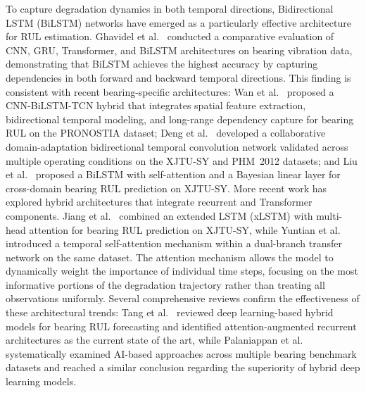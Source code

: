 \documentclass[review]{elsarticle}
\begin{document}
To capture degradation dynamics in both temporal directions,
Bidirectional LSTM (BiLSTM) networks have emerged as a particularly
effective architecture for RUL estimation.
Ghavidel et al.~\cite{ghavidel_remaining_2026} conducted a
comparative evaluation of CNN, GRU, Transformer, and BiLSTM
architectures on bearing vibration data, demonstrating that BiLSTM
achieves the highest accuracy by capturing dependencies in both
forward and backward temporal directions. This finding is consistent
with recent bearing-specific architectures:
Wan et al.~\cite{wan_robust_2026} proposed a CNN-BiLSTM-TCN hybrid
that integrates spatial feature extraction, bidirectional temporal
modeling, and long-range dependency capture for bearing RUL on the
PRONOSTIA dataset;
Deng et al.~\cite{DENG2026112193} developed a collaborative
domain-adaptation bidirectional temporal convolution network validated
across multiple operating conditions on the XJTU-SY and PHM~2012
datasets; and
Liu et al.~\cite{liu_deep_2026} proposed a BiLSTM with self-attention
and a Bayesian linear layer for cross-domain bearing RUL prediction on
XJTU-SY. More recent work has explored
hybrid architectures that integrate recurrent and Transformer
components. Jiang et al.~\cite{s26051578} combined an extended LSTM
(xLSTM) with multi-head attention for bearing RUL prediction on
XJTU-SY, while
Yuntian et al.~\cite{YONGXING2026104313} introduced a temporal
self-attention mechanism within a dual-branch transfer network on the
same dataset. The attention mechanism
allows the model to dynamically weight the importance of individual
time steps, focusing on the most informative portions of the
degradation trajectory rather than treating all observations
uniformly. Several comprehensive reviews confirm the effectiveness
of these architectural trends: Tang et al.~\cite{tang_deep_2025}
reviewed deep learning-based hybrid models for bearing RUL
forecasting and identified attention-augmented recurrent architectures
as the current state of the art, while
Palaniappan et al.~\cite{palaniappan_systematic_2026} systematically
examined AI-based approaches across multiple bearing benchmark datasets
and reached a similar conclusion regarding the superiority of hybrid
deep learning models.\\
\end{document}
